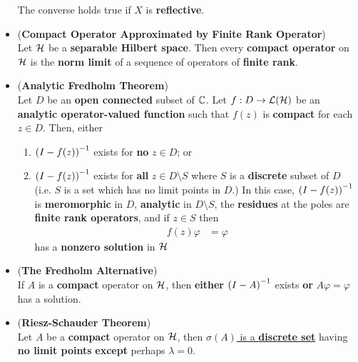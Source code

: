 \documentclass[11pt]{article}
\begin{document}
\begin{itemize}
\begin{theorem}
The converse holds true if $X$ is \textbf{reflective}.
\end{theorem}

\item 
\begin{theorem} (\textbf{Compact Operator Approximated by Finite Rank Operator})\citep{reed1980methods}\\
Let ${\mathcal H}$ be a \textbf{separable Hilbert space}. Then every \textbf{compact operator} on ${\mathcal H}$ is the \textbf{norm limit} of a sequence of operators of \textbf{finite rank}. 
\end{theorem}

\item \begin{theorem} (\textbf{Analytic Fredholm Theorem}) \citep{reed1980methods} \\
Let $D$ be an \textbf{open connected} subset of ${\mathbb C}$. Let $f: D \rightarrow {\mathcal L}({\mathcal H})$ be an \textbf{analytic operator-valued function} such that $f(z)$ is \textbf{compact} for each $z \in D$. Then, either 
\begin{enumerate}
\item $\left(I - f(z)\right)^{-1}$  exists for \textbf{no} $z \in D$; or

\item $\left(I - f(z)\right)^{-1}$ exists for \textbf{all} $z \in D \setminus S$ where $S$  is a \textbf{discrete} subset of $D$ (i.e. $S$ is a set which has no limit points in $D$.)
In this case,  $\left(I - f(z)\right)^{-1}$ is \textbf{meromorphic} in $D$, \textbf{analytic} in $D \setminus S$, the \textbf{residues} at the poles are \textbf{finite rank operators}, and if $z \in S$ then
\begin{align*}
f(z)\varphi &= \varphi
\end{align*} has a \textbf{nonzero solution} in ${\mathcal H}$
\end{enumerate}
\end{theorem}

\item \begin{corollary}(\textbf{The Fredholm Alternative}) \citep{reed1980methods}\\
If $A$ is a \textbf{compact} operator on ${\mathcal H}$,  then \textbf{either} $\left(I - A\right)^{-1}$ exists \textbf{or} $Α\varphi = \varphi$ has a solution. 
\end{corollary}

\item \begin{theorem} (\textbf{Riesz-Schauder Theorem})  \citep{reed1980methods}\\
Let $A$ be a \textbf{compact} operator on ${\mathcal H}$, then \underline{$\sigma(A)$ is a \textbf{discrete set}} having \textbf{no limit points} \textbf{except} perhaps 
$\lambda = 0$. 


\end{theorem}
\end{itemize}
\end{document}
